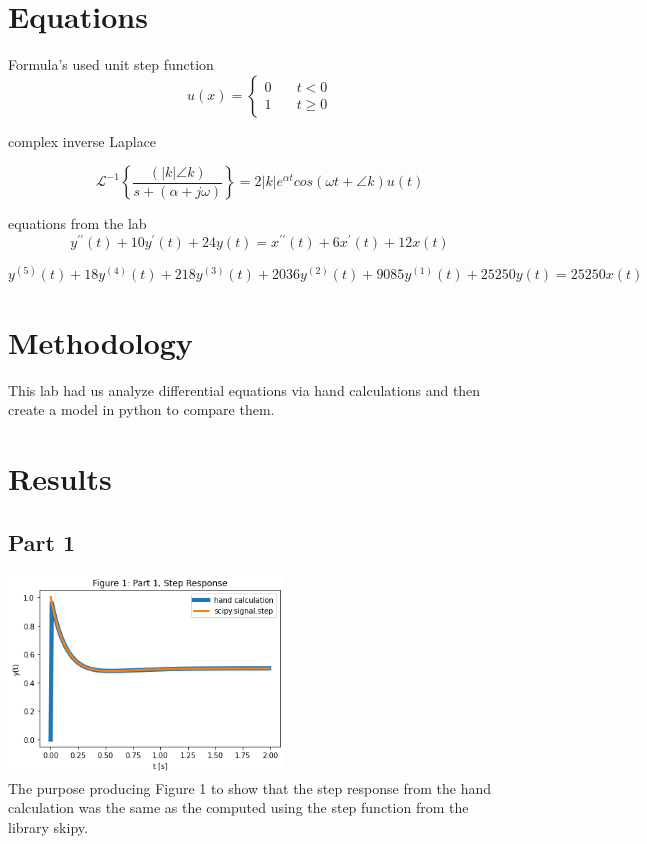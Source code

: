 \documentclass[12pt,a4paper]{article}
\begin{document}
\section{Equations}\label{sec:lit-rev}
Formula's used
unit step function
\[
u(x) = \left\{
        \begin{array}{ll}
            0 & \quad t < 0 \\
            1 & \quad t \geq 0
        \end{array}
    \right.
\]

complex inverse Laplace

\[\mathcal{L} ^{-1}\left \lbrace \frac {\left(| k | \angle {k}\right)}{s+\left(\alpha+j\omega\right)} \right \rbrace = 2 |k| e^{\alpha t} cos(\omega t + \angle k ) u(t)\]

equations from the lab
\[y^{\prime \prime}(t) + 10y^{\prime}(t) + 24y(t) = x^{\prime\prime}(t) + 6x^{\prime}(t) + 12x(t) \]

\[y^{(5)}(t) + 18y^{(4)}(t) + 218y^{(3)}(t) + 2036y^{(2)}(t) + 9085y^{(1)}(t) + 25250y(t) = 25250x(t)\]

\section{Methodology}\label{sec:meth}
This lab had us analyze differential equations via hand calculations and then create a model in python to compare them.

\section{Results}\label{sec:res}
\subsection*{Part 1}

\includegraphics[width=0.55\textwidth]{Figure1.png}\\
The purpose producing Figure 1 to show that the step response from the hand calculation was the same as the computed  using the step function from the library skipy.
\end{document}

